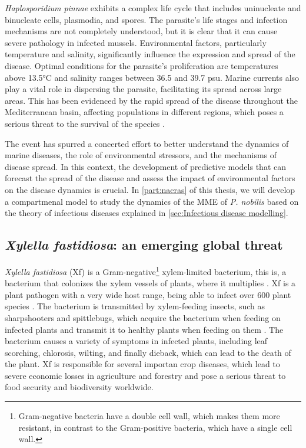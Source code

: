 \textit{Haplosporidium pinnae} exhibits a complex life cycle that includes
uninucleate and binucleate cells, plasmodia, and spores. The parasite's life
stages and infection mechanisms are not completely understood, but it is clear
that it can cause severe pathology in infected mussels. Environmental factors,
particularly temperature and salinity, significantly influence the expression
and spread of the disease. Optimal conditions for the parasite's proliferation
are temperatures above 13.5°C and salinity ranges between 36.5 and 39.7 psu.
Marine currents also play a vital role in dispersing the parasite, facilitating
its spread across large areas. This has been evidenced by the rapid spread of
the disease throughout the Mediterranean basin, affecting populations in
different regions, which poses a serious threat to the survival of the species
\cite{Cabanellas2019}.

The event has spurred a concerted effort to better understand the dynamics of
marine diseases, the role of environmental stressors, and the mechanisms of
disease spread. In this context, the development of predictive models that can
forecast the spread of the disease and assess the impact of environmental
factors on the disease dynamics is crucial. In \cref{part:nacras} of this
thesis, we will develop a compartmenal model to study the dynamics of the MME
of \textit{P. nobilis} based on the theory of infectious diseases explained in
\cref{sec:Infectious disease modelling}.

\subsection{\label{sec:Xylella fastidiosa: an emerging global
    threat}\textit{Xylella
    fastidiosa}: an emerging global threat}

\textit{Xylella fastidiosa} (Xf) is a Gram-negative\footnote{Gram-negative
  bacteria have a double cell wall, which makes them more resistant, in
  contrast to the Gram-positive bacteria, which have a single cell wall.}
xylem-limited bacterium, this is, a bacterium that colonizes the xylem vessels
of plants, where it multiplies \cite{Wells1987}. Xf is a plant pathogen with a
very wide host range, being able to infect over 600 plant species
\cite{Delbianco2019}. The bacterium is transmitted by xylem-feeding insects,
such as sharpshooters and spittlebugs, which acquire the bacterium when feeding
on infected plants and transmit it to healthy plants when feeding on them
\cite{redak2004biology, Cornara2018}. The bacterium causes a variety of
symptoms in infected plants, including leaf scorching, chlorosis, wilting, and
finally dieback, which can lead to the death of the plant. Xf is responsible
for several importan crop diseases, which lead to severe economic losses in
agriculture and forestry and pose a serious threat to food security and
biodiversity worldwide.

